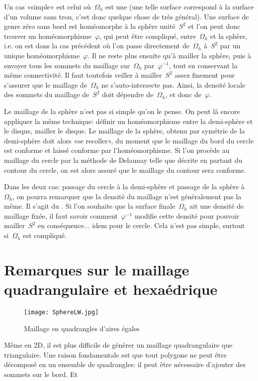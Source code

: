 \medskip
Un cas «simple» est celui où~$\Omega_h$ est une  (une telle surface correspond à la surface d'un volume sans trou, c'est donc quelque chose de très général).
Une surface de genre zéro sans bord est homéomorphe à la sphère unité~$S^2$ et l'on peut donc trouver un homéomorphisme~$\varphi$, qui peut être compliqué, entre~$\Omega_h$ et la sphère, i.e. on est dans la cas précédent où l'on passe directement de~$\Omega_h$ à~$S^2$ par un unique homéomorphisme~$\varphi$. Il ne reste plus ensuite qu'à mailler la sphère, puis à envoyer tous les sommets du maillage sur~$\Omega_h$ par~$\varphi^{-1}$, tout en conservant la même connectivité. Il faut toutefois veiller à mailler~$S^2$ assez finement pour s'assurer que le maillage de~$\Omega_h$ ne s'auto-intersecte pas. Ainsi, la densité locale des sommets du maillage de~$S^2$ doit dépendre de~$\Omega_h$, et donc de~$\varphi$.

Le maillage de la sphère n'est pas si simple qu'on le pense.
On peut là encore appliquer la même technique: définir un homéomorphisme entre la demi-sphère et le disque, mailler le disque. Le maillage de la sphère, obtenu par symétrie de la demi-sphère doit alors «se recoller», du moment que le maillage du bord du cercle est conforme et laissé conforme par l'homéomorphisme. Si l'on procède au maillage du cercle par la méthode de Delaunay telle que décrite en partant du contour du cercle, on est alors assuré que le maillage du contour sera conforme.

Dans les deux cas: passage du cercle à la demi-sphère et passage de la sphère à~$\Omega_h$, on pourra remarquer que la densité du maillage n'est généralement pas la même. Il s'agit du . Si l'on souhaite que la surface finale~$\Omega_h$ ait une densité de maillage fixée, il faut savoir comment~$\varphi^{-1}$ modifie cette densité pour pouvoir mailler~$S^2$ en conséquence... idem pour le cercle. Cela n'est pas simple, surtout si~$\Omega_h$ est compliqué.

\medskip\ifVersionDuDocEstVincent\else\newpage\fi
\section{Remarques sur le maillage quadrangulaire et hexaédrique}\label{Sec-MeshQuad}

\begin{wrapfigure}{r}{45mm}
\begin{center}
\texttt{[image: SphereLW.jpg]}
\end{center}
\caption{Maillage en quadrangles d'aires égales}\label{Fig-sphereLW}
\end{wrapfigure}
Même en 2D, il est plus difficile de générer un maillage quadrangulaire que triangulaire.
Une raison fondamentale est que tout polygone ne peut être décomposé en un ensemble de quadrangles: il peut être nécessaire d'ajouter des sommets sur le bord. Et 

